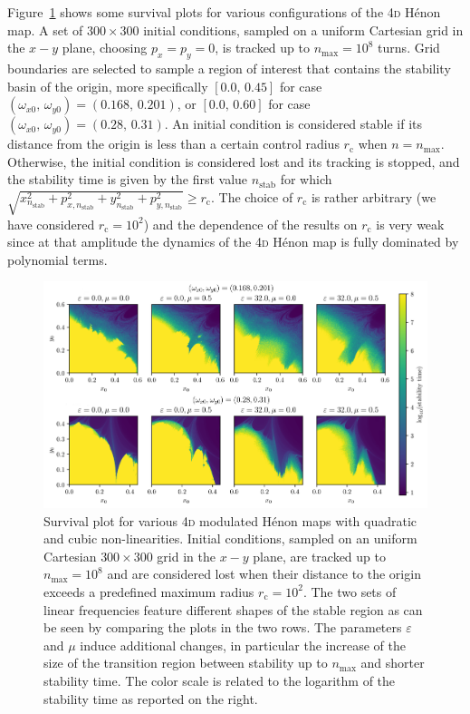Figure~\ref{fig:survival} shows some survival plots for various configurations of the 4\textsc{d} Hénon map. A set of $300\times300$ initial conditions, sampled on a uniform Cartesian grid in the $x-y$ plane, choosing $p_x = p_y = 0$, is tracked up to $n_\mathrm{max}=10^8$ turns. Grid boundaries are selected to sample a region of interest that contains the stability basin of the origin, more specifically $[0.0,\,0.45]$ for case $(\omega_{x0},\,\omega_{y0}) = (0.168,\,0.201)$, or $[0.0,\,0.60]$ for case $(\omega_{x0},\,\omega_{y0}) = (0.28,\,0.31)$. An initial condition is considered stable if its distance from the origin is less than a certain control radius $r_\mathrm{c}$ when $n=n_\mathrm{max}$. Otherwise, the initial condition is considered lost and its tracking is stopped, and the stability time is given by the first value $n_\mathrm{stab}$ for which $\sqrt{x^2_{n_\mathrm{stab}}+ p_{x,n_\mathrm{stab}}^2+y_{n_\mathrm{stab}}^2+p_{y,n_\mathrm{stab}}^2}\geq r_\mathrm{c}$. The choice of $r_\mathrm{c}$ is rather arbitrary (we have considered $r_\mathrm{c}=10^2$) and the dependence of the results on $r_\mathrm{c}$ is very weak since at that amplitude the dynamics of the 4\textsc{d} Hénon map is fully dominated by polynomial terms. 
%
\begin{figure}[th]
    \centering
    \includegraphics[width=\textwidth]{6_dynamic_indicators/fig/stability.png}
    \caption{Survival plot for various 4\textsc{d} modulated Hénon maps with quadratic and cubic non-linearities. Initial conditions, sampled on an uniform Cartesian $300\times300$ grid in the $x-y$ plane, are tracked up to $n_\text{max}=10^8$ and are considered lost when their distance to the origin exceeds a predefined maximum radius $r_\mathrm{c}=10^2$. The two sets of linear frequencies feature different shapes of the stable region as can be seen by comparing the plots in the two rows. The parameters $\varepsilon$ and $\mu$ induce additional changes, in particular the increase of the size of the transition region between stability up to $n_\mathrm{max}$ and shorter stability time. The color scale is related to the logarithm of the stability time as reported on the right.}
    \label{fig:survival}
\end{figure}
